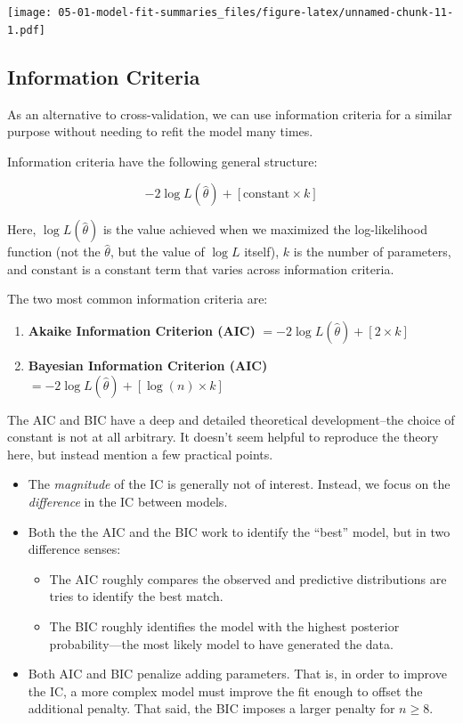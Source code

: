 \documentclass[
]{book}
\providecommand{\tightlist}{%
  \setlength{\itemsep}{0pt}\setlength{\parskip}{0pt}}
\begin{document}
\texttt{[image: 05-01-model-fit-summaries\_files/figure-latex/unnamed-chunk-11-1.pdf]}

\hypertarget{information-criteria}{%
\subsection{Information Criteria}\label{information-criteria}}

As an alternative to cross-validation, we can use information criteria for a similar purpose without needing to refit the model many times.

Information criteria have the following general structure:

\[
-2 \log L(\hat{\theta}) + [\text{constant}\times k ]
\]

Here, \(\log L(\hat{\theta})\) is the value achieved when we maximized the log-likelihood function (not the \(\hat{\theta}\), but the value of \(\log L\) itself), \(k\) is the number of parameters, and \(\text{constant}\) is a constant term that varies across information criteria.

The two most common information criteria are:

\begin{enumerate}
\def\labelenumi{\arabic{enumi}.}
\tightlist
\item
  \textbf{Akaike Information Criterion (AIC)} \(= -2 \log L(\hat{\theta}) + [2 \times k]\)
\item
  \textbf{Bayesian Information Criterion (AIC)} \(= -2 \log L(\hat{\theta}) + [\log(n) \times k]\)
\end{enumerate}

The AIC and BIC have a deep and detailed theoretical development--the choice of constant is not at all arbitrary. It doesn't seem helpful to reproduce the theory here, but instead mention a few practical points.

\begin{itemize}
\tightlist
\item
  The \emph{magnitude} of the IC is generally not of interest. Instead, we focus on the \emph{difference} in the IC between models.
\item
  Both the the AIC and the BIC work to identify the ``best'' model, but in two difference senses:

  \begin{itemize}
  \tightlist
  \item
    The AIC roughly compares the observed and predictive distributions are tries to identify the best match.
  \item
    The BIC roughly identifies the model with the highest posterior probability---the most likely model to have generated the data.
  \end{itemize}
\item
  Both AIC and BIC penalize adding parameters. That is, in order to improve the IC, a more complex model must improve the fit enough to offset the additional penalty. That said, the BIC imposes a larger penalty for \(n \geq 8\).
\end{itemize}
\end{document}
